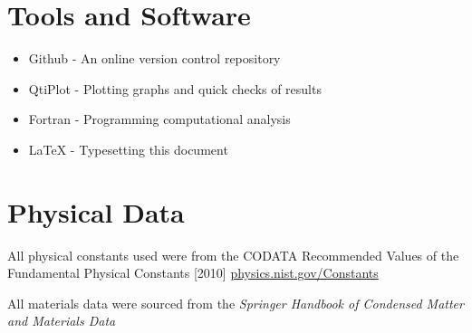 \documentclass[12pt]{article}
\begin{document}
\section{Tools and Software}

\begin{itemize}
  \item Github - An online version control repository
  \item QtiPlot - Plotting graphs and quick checks of results
  \item Fortran - Programming computational analysis
  \item LaTeX - Typesetting this document
\end{itemize}

\section{Physical Data}
All physical constants used were from the CODATA Recommended Values of the Fundamental Physical Constants [2010] \url{physics.nist.gov/Constants}

All materials data were sourced from the \emph{Springer Handbook of Condensed Matter and Materials Data} \cite{springer}

\end{document}
